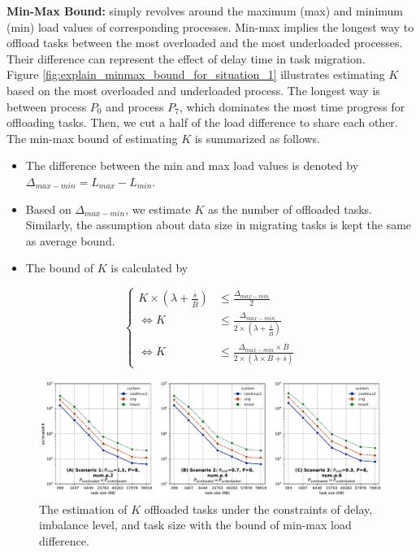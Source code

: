 \noindent \textbf{Min-Max Bound:} simply revolves around the maximum (max) and minimum (min) load values of corresponding processes. Min-max implies the longest way to offload tasks between the most overloaded and the most underloaded processes. Their difference can represent the effect of delay time in task migration.\\

Figure \ref{fig:explain_minmax_bound_for_situation_1} illustrates estimating $K$ based on the most overloaded and underloaded process. The longest way is between process $P_{0}$ and process $P_{7}$, which dominates the most time progress for offloading tasks. Then, we cut a half of the load difference to share each other. The min-max bound of estimating $K$ is summarized as follows.

\begin{itemize}
	\item The difference between the min and max load values is denoted by $\Delta_{max-min} = L_{max} - L_{min}$.
	\item Based on $\Delta_{max-min}$, we estimate $K$ as the number of offloaded tasks. Similarly, the assumption about data size in migrating tasks is kept the same as average bound.
	\item  The bound of $K$ is calculated by
\end{itemize}

\begin{equation} \label{eq:minmax_bound}
	\begin{cases}
		K \times (\lambda + \frac{\overline{s}}{\overline{B}}) &\leq \frac{\Delta_{max-min}}{2} \\
		\Leftrightarrow K  &\leq \frac{\Delta_{max-min}}{2 \times (\lambda + \frac{\overline{s}}{\overline{B}})} \\
		\Leftrightarrow K  &\leq \frac{\Delta_{max-min} \times \overline{B}}{2 \times (\lambda \times \overline{B} + \overline{s})}
	\end{cases}
\end{equation}

\begin{figure}[t]
  \centering
  \includegraphics[scale=0.4375]{./pictures/perf_analysis_model/perf_k_offload_tasks_minmax_bound.pdf}
	\caption{The estimation of $K$ offloaded tasks under the constraints of delay, imbalance level, and task size with the bound of min-max load difference.}
	\label{fig:k_estimation_minmax_bound}
\end{figure}

